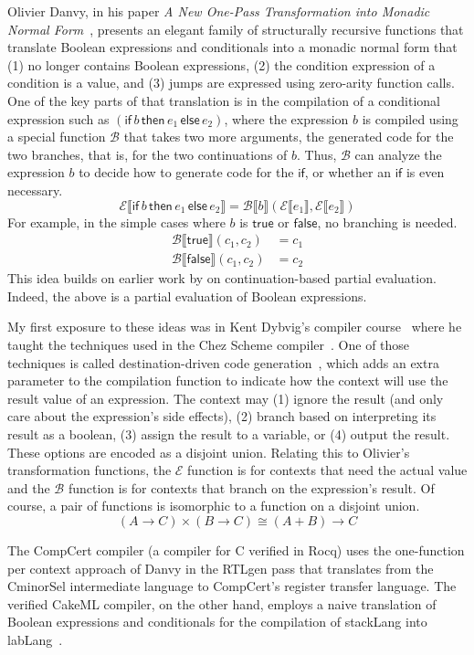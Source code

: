 \documentclass[sigplan,review,dvipsnames,screen,10pt]{acmart}
\newcommand{\TRUE}[0]{\mathsf{true}}
\newcommand{\FALSE}[0]{\mathsf{false}}
\newcommand{\IF}[3]{\mathsf{if}\,#1\,\mathsf{then}\,#2\,\mathsf{else}\,#3}
\newcommand{\CE}[1]{\mathcal{E} \llbracket #1 \rrbracket}
\newcommand{\CB}[3]{\mathcal{B} \llbracket #1 \rrbracket ( #2, #3 )}
\begin{document}
Olivier Danvy, in his paper \emph{A New One-Pass Transformation into
Monadic Normal Form}~\citep{Danvy:2003fk}, presents an elegant family
of structurally recursive functions that translate Boolean expressions
and conditionals into a monadic normal form that (1) no longer
contains Boolean expressions, (2) the condition expression of a
condition is a value, and (3) jumps are expressed using zero-arity
function calls. One of the key parts of that translation is in the
compilation of a conditional expression such as $(\IF{b}{e_1}{e_2})$,
where the expression $b$ is compiled using a special function
$\mathcal{B}$ that takes two more arguments, the generated code for
the two branches, that is, for the two continuations of $b$. Thus,
$\mathcal{B}$ can analyze the expression $b$ to decide how to generate
code for the $\mathsf{if}$, or whether an $\mathsf{if}$ is even
necessary.
\[
\CE{\IF{b}{e_1}{e_2}} = \CB{b}{\CE{e_1}}{\CE{e_2}}
\]
For example, in the simple cases where $b$ is $\TRUE$ or $\FALSE$,
no branching is needed.
\begin{align*}
\CB{\TRUE}{c_1}{c_2} &= c_1 \\
\CB{\FALSE}{c_1}{c_2} &= c_2
\end{align*}
\noindent This idea builds on earlier work by \citet{Lawall:1994aa} on
continuation-based partial evaluation. Indeed, the above is a partial
evaluation of Boolean expressions.

My first exposure to these ideas was in Kent Dybvig's compiler
course~\citep{Dybvig:2010aa} where he taught the techniques used in
the Chez Scheme compiler~\citep{Dybvig:2006aa}.  One of those
techniques is called destination-driven code
generation~\citep{Dybvig:1990aa}, which adds an extra parameter to the
compilation function to indicate how the context will use the result
value of an expression. The context may (1) ignore the result (and
only care about the expression's side effects), (2) branch based on
interpreting its result as a boolean, (3) assign the result to a
variable, or (4) output the result. These options are encoded as a
disjoint union.  Relating this to Olivier's transformation functions,
the $\mathcal{E}$ function is for contexts that need the actual value
and the $\mathcal{B}$ function is for contexts that branch on the
expression's result. Of course, a pair of functions is isomorphic to a
function on a disjoint union.
\[
(A → C) × (B → C) ≅ (A + B) → C
\]

The CompCert compiler \citep{Leroy:2006fe} (a compiler for C verified
in Rocq) uses the one-function per context approach of Danvy in the
RTLgen pass that translates from the CminorSel intermediate language
to CompCert's register transfer language. The verified CakeML
compiler, on the other hand, employs a naive translation of Boolean
expressions and conditionals for the compilation of stackLang into
labLang~\citep{Kumar:2014aa}.
\end{document}
